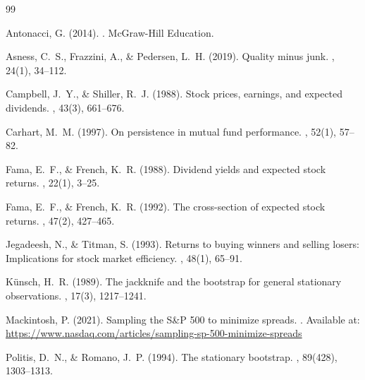 \documentclass[12pt,a4paper]{article}
\theoremstyle{definition}
\begin{document}
\newpage

\begin{thebibliography}{99}

Antonacci, G. (2014).
.
\newblock McGraw-Hill Education.

Asness, C.~S., Frazzini, A., \& Pedersen, L.~H. (2019).
\newblock Quality minus junk.
, 24(1), 34--112.

Campbell, J.~Y., \& Shiller, R.~J. (1988).
\newblock Stock prices, earnings, and expected dividends.
, 43(3), 661--676.

Carhart, M.~M. (1997).
\newblock On persistence in mutual fund performance.
, 52(1), 57--82.

Fama, E.~F., \& French, K.~R. (1988).
\newblock Dividend yields and expected stock returns.
, 22(1), 3--25.

Fama, E.~F., \& French, K.~R. (1992).
\newblock The cross-section of expected stock returns.
, 47(2), 427--465.

Jegadeesh, N., \& Titman, S. (1993).
\newblock Returns to buying winners and selling losers: Implications for stock market efficiency.
, 48(1), 65--91.

K\"{u}nsch, H.~R. (1989).
\newblock The jackknife and the bootstrap for general stationary observations.
, 17(3), 1217--1241.

Mackintosh, P. (2021).
\newblock Sampling the S\&P 500 to minimize spreads.
.
\newblock Available at: \url{https://www.nasdaq.com/articles/sampling-sp-500-minimize-spreads}

Politis, D.~N., \& Romano, J.~P. (1994).
\newblock The stationary bootstrap.
, 89(428), 1303--1313.

\end{thebibliography}
\end{document}
